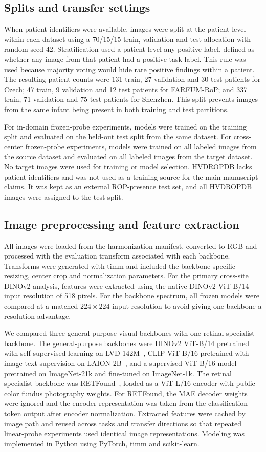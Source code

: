 \documentclass[pdflatex,sn-vancouver,Numbered,iicol]{sn-jnl}
\begin{document}
\subsection{Splits and transfer settings}
When patient identifiers were available, images were split at the patient level
within each dataset using a 70/15/15 train, validation and test allocation with
random seed 42. Stratification used a patient-level any-positive label, defined as
whether any image from that patient had a positive task label. This rule was used
because majority voting would hide rare positive findings within a patient. The
resulting patient counts were 131 train, 27 validation and 30 test patients for
Czech; 47 train, 9 validation and 12 test patients for FARFUM-RoP; and 337 train,
71 validation and 75 test patients for Shenzhen. This split prevents images from
the same infant being present in both training and test partitions.

For in-domain frozen-probe experiments, models were trained on the training split
and evaluated on the held-out test split from the same dataset. For cross-center
frozen-probe experiments, models were trained on all labeled images from the
source dataset and evaluated on all labeled images from the target dataset. No
target images were used for training or model selection. HVDROPDB lacks patient
identifiers and was not used as a training source for the main manuscript claims.
It was kept as an external ROP-presence test set, and all HVDROPDB images were
assigned to the test split.

\subsection{Image preprocessing and feature extraction}
All images were loaded from the harmonization manifest, converted to RGB and
processed with the evaluation transform associated with each backbone. Transforms
were generated with timm and included the backbone-specific resizing, center crop
and normalization parameters. For the primary cross-site DINOv2 analysis, features
were extracted using the native DINOv2 ViT-B/14 input resolution of 518 pixels.
For the backbone spectrum, all frozen models were compared at a matched
$224{\times}224$ input resolution to avoid giving one backbone a resolution
advantage.

We compared three general-purpose visual backbones with one retinal specialist
backbone. The general-purpose backbones were DINOv2 ViT-B/14 pretrained with
self-supervised learning on LVD-142M~\cite{dinov2}, CLIP ViT-B/16 pretrained with
image-text supervision on LAION-2B~\cite{clip2021}, and a supervised ViT-B/16
model pretrained on ImageNet-21k and fine-tuned on ImageNet-1k. The retinal
specialist backbone was RETFound~\cite{retfound2023}, loaded as a ViT-L/16
encoder with public color fundus photography weights. For RETFound, the MAE
decoder weights were ignored and the encoder representation was taken from the
classification-token output after encoder normalization. Extracted features were
cached by image path and reused across tasks and transfer directions so that
repeated linear-probe experiments used identical image representations. Modeling
was implemented in Python using PyTorch, timm and scikit-learn.
\end{document}
